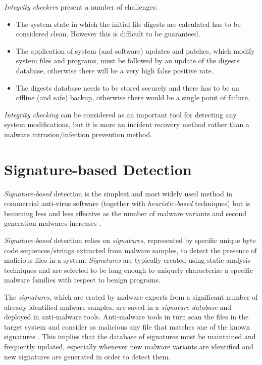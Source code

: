 \documentclass[pdfa%
,cucitura%
]{toptesi}
\begin{document}
\textit{Integrity checkers} present a number of challenges:
\begin{itemize}
	\item The system state in which the initial file digests are calculated has to be considered clean. However this is difficult to be guaranteed.
	
	\item The application of system (and software) updates and patches, which modify system files and programs, must be followed by an update of the digests database, otherwise there will be a very high false positive rate.
	
	\item The digests database needs to be stored securely and there has to be an offline (and safe) backup, otherwise there would be a single point of failure.
\end{itemize}

\textit{Integrity checking} can be considered as an important tool for detecting any system modifications, but it is more an incident recovery method rather than a malware intrusion/infection prevention method.

\section{Signature-based Detection}
\textit{Signature-based} detection is the simplest and most widely used method in commercial anti-virus software (together with \textit{heuristic-based} techniques) but is becoming less and less effective as the number of malware variants and second generation malwares increases \cite{NguyenSPVD}.

\textit{Signature-based} detection relies on \textit{signatures}, represented by specific unique byte code sequences/strings extracted from malware samples, to detect the presence of malicious files in a system. \textit{Signatures} are typically created using static analysis techniques and are selected to be long enough to uniquely characterize a specific malware families with respect to benign programs.

The \textit{signatures}, which are crated by malware experts from a significant number of already identified malware samples, are saved in a \textit{signature database} and deployed in anti-malware tools. Anti-malware tools in turn scan the files in the target system and consider as malicious any file that matches one of the known signatures \cite{NamanyaTWM}. This implies that the database of signatures must be maintained and frequently updated, especially whenever new malware variants are identified and new signatures are generated in order to detect them.
\end{document}
